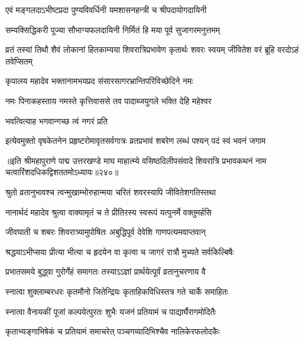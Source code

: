 \twolineshloka
{एवं मङ्गलदाऽभीष्टप्रदा पुण्यविवर्धिनी}
{यमशासनहन्त्री च श्रीपदायोगदायिनी} %

\twolineshloka
{सम्यक्सिद्धिकरी पूज्या सौभाग्यफलदायिनी}
{निर्मितं हि मया पूर्व सुजागरमनुत्तमम्} %

\threelineshloka
{व्रतं तस्यां तिथौ शैवं लोकानां हितकाम्यया}
{शिवरात्रिप्रभावेण कृतार्थः शवरः स्वयम्}
{जीवितेश वरं ब्रूहि वरदोऽहं तवेप्सितम्} %


\twolineshloka
{कृपालय महादेव भक्तानामभयप्रद}
{संसारसागरभ्रान्तिपरिविच्छेदिने नमः} %

\twolineshloka
{नमः पिनाकहस्ताय नमस्ते कृत्तिवाससे}
{तव पादाब्जयुगले भक्ति देहि महेश्वर} %


\onelineshloka
{भवत्वित्याह भगवान्गच्छ त्वं नगरं प्रति} %

\fourlineindentedshloka
{इत्येवमुक्तो वृषकेतनेन}
{प्रहृष्टरोमावृतसर्वगात्रः}
{व्रतप्रभावं शबरेण लब्धं}
{पश्यन् पदं स्वं भवनं जगाम} %


॥इति श्रीमहापुराणे पाद्म उत्तरखण्डे माघ माहात्म्ये वसिष्ठदिलीपसंवादे शिवरात्रि प्रभावकथनं नाम चत्वारिंशदधिकद्विशततमोऽध्यायः॥२४०॥


\resetShloka


\twolineshloka
{श्रुतो व्रतानुभावश्च त्वन्मुखाम्भोरुहान्मया}
{चरितं शवरस्यापि जीवितेशगतिस्तथा} %

\twolineshloka
{नानार्थदं महादेव श्रुत्वा वाक्यामृतं च ते}
{प्रीतिरस्य स्वरूपं यत्पुनर्मे वक्तुमर्हसि} %


\twolineshloka
{जीवघाती च शबरः शिवरात्र्यामुपोषितः}
{अबुद्धिपूर्व देवेशि गाणपत्यमवाप्तवान्} %

\twolineshloka
{श्रद्धयाऽभीप्सया प्रीत्या भीत्या च हृदयेन वा}
{कृत्वा च जागरं रात्रौ मुच्यते सर्वकिल्बिषैः} %

\twolineshloka
{प्रभातसमये बुद्ध्वा गुरोर्गेहं समागतः}
{तस्याऽऽज्ञां प्रार्थयेत्पूर्वं व्रतानुचरणाय वै} %

\twolineshloka
{स्नात्वा शुक्लाम्बरधरः कृतमौनो जितेन्द्रियः}
{कृताहिकविधिस्तत्र गते चार्के समाहितः} %

\twolineshloka
{स्नात्वा वैनायकीं पूजां कल्पयेत्पुरतः शुभैः}
{यजनं प्रतियामं च पाद्यार्घैरागमोदितैः} %

\twolineshloka
{कृताभ्यङ्गाभिषेकं च प्रतियामं समाचरेत्}
{पञ्चगव्यादिभिश्चैव नालिकेरफलोदकैः} %

